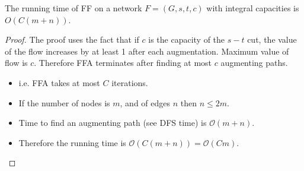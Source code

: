 \documentclass[a4paper]{article}
\begin{document}
\begin{lemma}
The running time of FF on a network $F=(G,s,t,c)$ with integral capacities is $O(C(m+n))$.
\end{lemma}
\begin{proof}
The proof uses the fact that if $c$ is the capacity of the $s-t$ cut, the value of the flow increases by at least 1 after each augmentation. Maximum value of flow is $c$. Therefore FFA terminates after finding at most $c$ augmenting paths. 
\begin{itemize}
    \item i.e. FFA takes at most $C$ iterations.
    \item If the number of nodes is $m$, and of edges $n$ then $n \leq 2m$.
    \item Time to find an augmenting path (see DFS time) is $\mathcal{O}(m+n)$.
    \item Therefore the running time is $\mathcal{O}\left(C(m+n) \right)=\mathcal{O}(Cm)$.
\end{itemize}
\end{proof}
\end{document}
